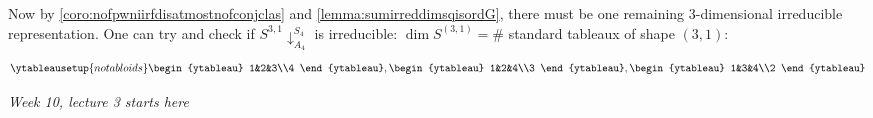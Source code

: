 \documentclass{article}
\theoremstyle{definition}
\begin{document}
Now by \ref{coro:nofpwniirfdisatmostnofconjclas} and \ref{lemma:sumirreddimsqisordG}, there must be one remaining 3-dimensional irreducible representation. One can try and check if $S^{3,1}\downarrow_{A_4}^{S_4}$ is irreducible: $\dim S^{(3,1)}=\# $ standard tableaux of shape $(3,1)$:
\[
\ytableausetup{notabloids}
\begin{ytableau}
1&2&3\\4
\end{ytableau},\begin{ytableau}
1&2&4\\3
\end{ytableau},\begin{ytableau}
1&3&4\\2
\end{ytableau}
\]
\begin{flushright}
\textit{Week 10, lecture 3 starts here}
\end{flushright}
\end{document}
